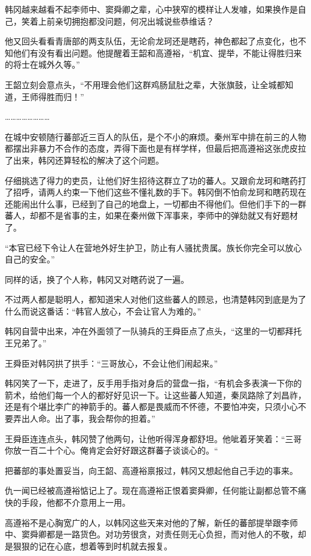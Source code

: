 韩冈越来越看不起李师中、窦舜卿之辈，心中狭窄的模样让人发噱，如果换作是自己，笑着上前亲切拥抱都没问题，何况出城说些恭维话？

他又回头看看青唐部的两支队伍，无论俞龙珂还是瞎药，神色都起了点变化，也不知他们有没有看出问题。他提醒着王韶和高遵裕，“机宜、提举，不能让得胜归来的将士在城外久等。”

王韶立刻会意点头，“不用理会他们这群鸡肠鼠肚之辈，大张旗鼓，让全城都知道，王师得胜而归！”

……………………

在城中安顿随行蕃部近三百人的队伍，是个不小的麻烦。秦州军中排在前三的人物都摆出非暴力不合作的态度，弄得下面也是有样学样，但最后把高遵裕这张虎皮拉了出来，韩冈还算轻松的解决了这个问题。

仔细挑选了得力的吏员，让他们好生招待这群立了功的蕃人。又跟俞龙珂和瞎药打了招呼，请两人约束一下他们这些不懂礼数的手下。韩冈倒不怕俞龙珂和瞎药现在还能闹出什么事，已经到了自己的地盘上，一切都由不得他们。但他们手下的一群蕃人，却都不是省事的主，如果在秦州做下浑事来，李师中的弹劾就又有好题材了。

“本官已经下令让人在营地外好生护卫，防止有人骚扰贵属。族长你完全可以放心自己的安全。”

同样的话，换了个人称，韩冈又对瞎药说了一遍。

不过两人都是聪明人，都知道宋人对他们这些蕃人的顾忌，也清楚韩冈到底是为了什么而说这番话：“韩官人放心，不会让官人为难的。”

韩冈自营中出来，冲在外面领了一队骑兵的王舜臣点了点头，“这里的一切都拜托王兄弟了。”

王舜臣对韩冈拱了拱手：“三哥放心，不会让他们闹起来。”

韩冈笑了一下，走进了，反手用手指对身后的营盘一指，“有机会多表演一下你的箭术，给他们每一个人的都好好见识一下。让这些蕃人知道，秦凤路除了刘昌祚，还是有个堪比李广的神箭手的。蕃人都是畏威而不怀德，不要怕冲突，只须小心不要弄出人命。出了事，我会帮你的担着。”

王舜臣连连点头，韩冈赞了他两句，让他听得浑身都舒坦。他呲着牙笑着：“三哥你放一百二十个心。俺肯定会好好跟这群蕃子谈谈心的。“

把蕃部的事处置妥当，向王韶、高遵裕禀报过，韩冈又想起他自己手边的事来。

仇一闻已经被高遵裕惦记上了。现在高遵裕正恨着窦舜卿，任何能让副都总管不痛快的手段，他都不介意用上一用。

高遵裕不是心胸宽广的人，以韩冈这些天来对他的了解，新任的蕃部提举跟李师中、窦舜卿都是一路货色。对功劳很贪，对责任则无心负担，而对他人的不敬，却是狠狠的记在心底，想着等到时机就去报复。

